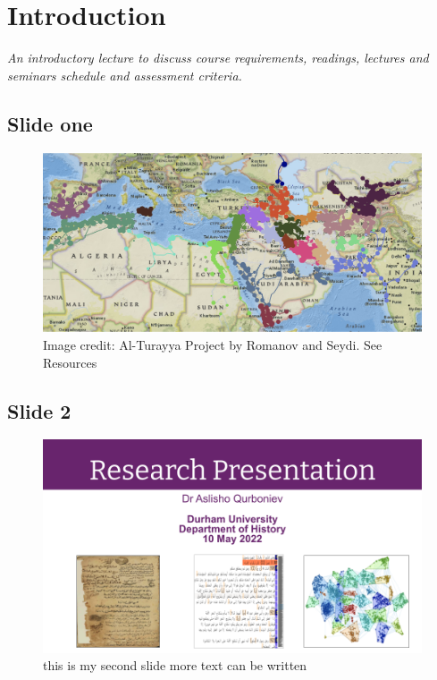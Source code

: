 \documentclass[
]{book}
\begin{document}
\hypertarget{introduction}{%
\chapter{Introduction}\label{introduction}}

\emph{An introductory lecture to discuss course requirements, readings, lectures and seminars schedule and assessment criteria.}

\hypertarget{slide-one}{%
\section{Slide one}\label{slide-one}}

\begin{figure}
\centering
\includegraphics{./files/map3.png}
\caption{Image credit: Al-Turayya Project by Romanov and Seydi. See Resources}
\end{figure}

\hypertarget{slide-2}{%
\section{Slide 2}\label{slide-2}}

\begin{figure}
\centering
\includegraphics{./files/slide1.png}
\caption{this is my second slide more text can be written}
\end{figure}
\end{document}
